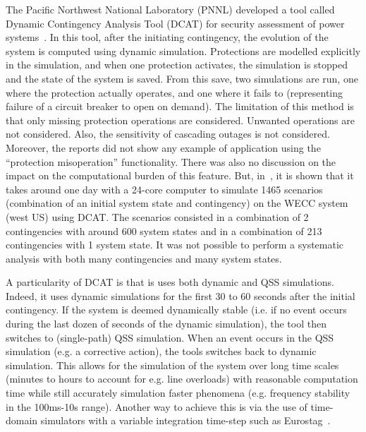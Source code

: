 The Pacific Northwest National Laboratory (PNNL) developed a tool called Dynamic Contingency Analysis Tool (DCAT) for security assessment of power systems~\cite{DCATphase1, DCATphase2}. In this tool, after the initiating contingency, the evolution of the system is computed using dynamic simulation. Protections are modelled explicitly in the simulation, and when one protection activates, the simulation is stopped and the state of the system is saved. From this save, two simulations are run, one where the protection actually operates, and one where it fails to (representing failure of a circuit breaker to open on demand). The limitation of this method is that only missing protection operations are considered. Unwanted operations are not considered. Also, the sensitivity of cascading outages is not considered. Moreover, the reports did not show any example of application using the ``protection misoperation'' functionality. There was also no discussion on the impact on the computational burden of this feature. But, in~\cite{DCAT_2023}, it is shown that it takes around one day with a 24-core computer to simulate 1465 scenarios (combination of an initial system state and contingency) on the WECC system (west US) using DCAT. The scenarios consisted in a combination of 2 contingencies with around 600 system states and in a combination of 213 contingencies with 1 system state. It was not possible to perform a systematic analysis with both many contingencies and many system states.

A particularity of DCAT is that is uses both dynamic and QSS simulations. Indeed, it uses dynamic simulations for the first 30 to 60 seconds after the initial contingency. If the system is deemed dynamically stable (i.e. if no event occurs during the last dozen of seconds of the dynamic simulation), the tool then switches to (single-path) QSS simulation. When an event occurs in the QSS simulation (e.g. a corrective action), the tools switches back to dynamic simulation. This allows for the simulation of the system over long time scales (minutes to hours to account for e.g. line overloads) with reasonable computation time while still accurately simulation faster phenomena (e.g. frequency stability in the 100ms-10s range). Another way to achieve this is via the use of time-domain simulators with a variable integration time-step such as Eurostag~\cite{STAG}.

